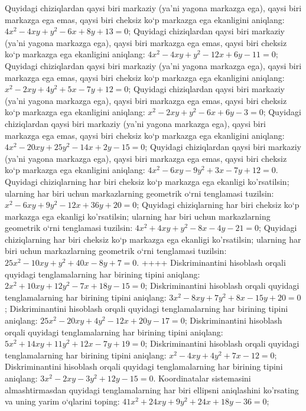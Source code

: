 Quyidagi chiziqlardan qaysi biri markaziy (ya’ni yagona markazga ega), qaysi biri markazga ega emas, qaysi biri cheksiz ko‘p markazga ega ekanligini aniqlang: $4 x^2-4 x y+y^2-6 x+8 y+13=0$;
Quyidagi chiziqlardan qaysi biri markaziy (ya’ni yagona markazga ega), qaysi biri markazga ega emas, qaysi biri cheksiz ko‘p markazga ega ekanligini aniqlang: $4 x^2-4 x y+y^2-12 x+6 y-11=0$;
Quyidagi chiziqlardan qaysi biri markaziy (ya’ni yagona markazga ega), qaysi biri markazga ega emas, qaysi biri cheksiz ko‘p markazga ega ekanligini aniqlang: $x^2-2 x y+4 y^2+5 x-7 y+12=0$;
Quyidagi chiziqlardan qaysi biri markaziy (ya’ni yagona markazga ega), qaysi biri markazga ega emas, qaysi biri cheksiz ko‘p markazga ega ekanligini aniqlang: $x^2-2 x y+y^2-6 x+6 y-3=0$;
Quyidagi chiziqlardan qaysi biri markaziy (ya’ni yagona markazga ega), qaysi biri markazga ega emas, qaysi biri cheksiz ko‘p markazga ega ekanligini aniqlang: $4 x^2-20 x y+25 y^2-14 x+2 y-15=0$;
Quyidagi chiziqlardan qaysi biri markaziy (ya’ni yagona markazga ega), qaysi biri markazga ega emas, qaysi biri cheksiz ko‘p markazga ega ekanligini aniqlang: $4 x^2-6 x y-9 y^2+3 x-7 y+12=0$.
Quyidagi chiziqlarning har biri cheksiz ko‘p markazga ega ekanligi ko'rsatilsin; ularning har biri uchun markazlarning geometrik o‘rni tenglamasi tuzilsin: $x^2-6 x y+9 y^2-12 x+36 y+20=0$;
Quyidagi chiziqlarning har biri cheksiz ko‘p markazga ega ekanligi ko'rsatilsin; ularning har biri uchun markazlarning geometrik o‘rni tenglamasi tuzilsin: $4 x^2+4 x y+y^2-8 x-4 y-21=0$;
Quyidagi chiziqlarning har biri cheksiz ko‘p markazga ega ekanligi ko'rsatilsin; ularning har biri uchun markazlarning geometrik o‘rni tenglamasi tuzilsin: $25 x^2-10 x y+y^2+40 x-8 y+7=0$.
++++
Diskriminantini hisoblash orqali quyidagi tenglamalarning har birining tipini aniqlang: $2 x^2+10 x y+12 y^2-7 x+18 y-15=0$;
Diskriminantini hisoblash orqali quyidagi tenglamalarning har birining tipini aniqlang: $3 x^2-8 x y+7 y^2+8 x-15 y+20=0$;
Diskriminantini hisoblash orqali quyidagi tenglamalarning har birining tipini aniqlang: $25 x^2-20 x y+4 y^2-12 x+20 y-17=0$;
Diskriminantini hisoblash orqali quyidagi tenglamalarning har birining tipini aniqlang: $5 x^2+14 x y+11 y^2+12 x-7 y+19=0$;
Diskriminantini hisoblash orqali quyidagi tenglamalarning har birining tipini aniqlang: $x^2-4 x y+4 y^2+7 x-12=0$;
Diskriminantini hisoblash orqali quyidagi tenglamalarning har birining tipini aniqlang: $3 x^2-2 x y-3 y^2+12 y-15=0$.
Koordinatalar sistemasini almashtirmasdan quyidagi tenglamalarning har biri ellipsni aniqlashini ko'rsating va uning yarim o‘qlarini toping: $41 x^2+24 x y+9 y^2+24 x+18 y-36=0$;
